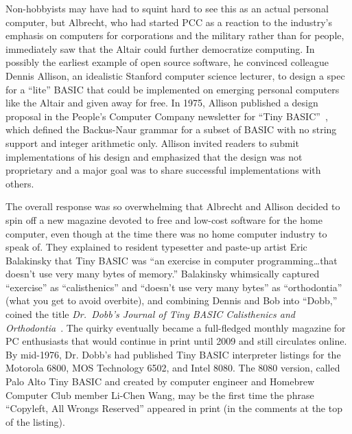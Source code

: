 
Non-hobbyists may have had to squint
hard to see this as an actual personal computer,
but Albrecht, who had started PCC as a reaction to
the industry's emphasis on computers for corporations and
the military rather than for people, 
immediately saw that the Altair could  further democratize computing.
In possibly the earliest example of open source software, he
convinced colleague Dennis Allison, an idealistic Stanford computer
science lecturer, to design a spec for a ``lite'' BASIC that could
be implemented on emerging personal
computers like the Altair and given
away for free.
In 1975, Allison published a design proposal in the People's Computer
Company newsletter for ``Tiny
BASIC''~\cite{allison_tiny_basic}, which defined the Backus-Naur grammar
for a subset of BASIC with no string support and integer arithmetic only.
Allison invited readers to submit implementations of his design and
emphasized that the design was not proprietary and a major goal was to
share successful implementations with others.

The overall response was so overwhelming that Albrecht and Allison
decided to spin off a new magazine devoted to free and low-cost software
for the home computer, even though at the time there was no home
computer industry to speak of.
They explained to resident typesetter
and paste-up artist Eric Balakinsky that Tiny BASIC was ``an exercise in
computer programming\ldots{}that doesn't use very many bytes of
memory.''
Balakinsky whimsically captured ``exercise'' as
``calisthenics'' and ``doesn't use very many bytes'' as ``orthodontia''
(what you get to avoid overbite), and combining Dennis and Bob into
``Dobb,'' coined the title \emph{Dr.~Dobb's Journal of Tiny BASIC
Calisthenics and Orthodontia}~\cite[p.~265]{dormouse}.
The quirky  eventually became a
full-fledged monthly magazine for PC enthusiasts that
would continue in print until 2009 and still circulates online.
By mid-1976, Dr. Dobb's had published Tiny BASIC interpreter listings
for the Motorola 6800, MOS Technology 6502, and Intel 8080.
The 8080
version, called Palo Alto Tiny BASIC and created by computer engineer
and Homebrew Computer Club member Li-Chen Wang, may be the first time
the phrase ``Copyleft, All Wrongs Reserved'' appeared in print (in the
comments at the top of the listing).

